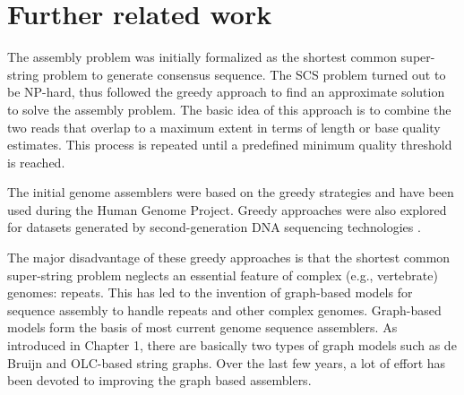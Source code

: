 
\section{Further related work}
The assembly problem was initially formalized as the shortest common super-string problem \citep{maier1978complexity} to generate consensus sequence.
The SCS problem turned out to be NP-hard, thus \cite{tarhio1988greedy} followed the greedy approach to find an approximate solution to solve the assembly problem.
The basic idea of this approach is to combine the two reads that overlap to a maximum extent in terms of length or base quality estimates.
This process is repeated until a predefined minimum quality threshold is reached.

The initial genome assemblers \citep{sutton1995tigr, Green99phrapdocumentation} were based on the greedy strategies and have been used during the Human Genome Project.
Greedy approaches were also explored for datasets generated by second-generation DNA sequencing technologies \citep{warren2006assembling, jeck2007extending}.

The major disadvantage of these greedy approaches is that the shortest common super-string problem neglects an essential feature of complex (e.g.,
vertebrate) genomes: repeats. This has led to the invention of graph-based models for sequence assembly to handle repeats and other complex genomes.
Graph-based models form the basis of most current genome sequence assemblers. 
As introduced in Chapter 1, there are basically two types of graph models such as de Bruijn and OLC-based string graphs.
Over the last few years, a lot of effort has been devoted to improving the graph based assemblers. 

